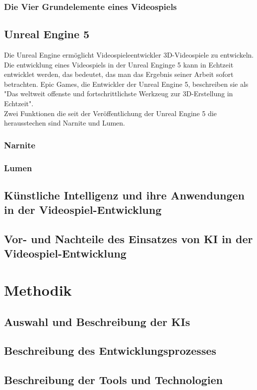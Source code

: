 \documentclass[12pt,a4paper,bibliography=totocnumbered,listof=totocnumbered]{scrartcl}
\begin{document}
\subsubsection{Die Vier Grundelemente eines Videospiels}%
\subsection{Unreal Engine 5}%
Die Unreal Engine ermöglicht Videospieleentwickler 3D-Videospiele zu entwickeln. Die entwicklung eines Videospiels in der Unreal Enginge 5 kann in Echtzeit entwicklet werden, das bedeutet, das man das Ergebnis seiner Arbeit sofort betrachten. Epic Games, die Entwickler der Unreal Engine 5, beschreiben sie als "Das weltweit offenste und fortschrittlichste Werkzeug zur 3D-Erstellung in Echtzeit".\\
Zwei Funktionen die seit der Veröffentlichung der Unreal Engine 5 die herausstechen sind Narnite und Lumen.
\subsubsection{Narnite}
\subsubsection{Lumen}
\subsection{Künstliche Intelligenz und ihre Anwendungen in der Videospiel-Entwicklung}
\subsection{Vor- und Nachteile des Einsatzes von KI in der Videospiel-Entwicklung}

\section{Methodik}
\subsection{Auswahl und Beschreibung der KIs}
\subsection{Beschreibung des Entwicklungsprozesses}
\subsection{Beschreibung der Tools und Technologien}
\end{document}
